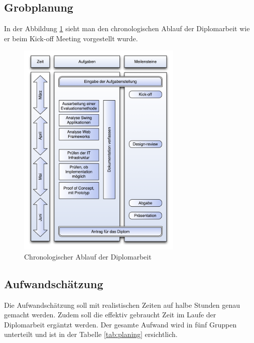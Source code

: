   \subsection{Grobplanung}
  
  In der Abbildung \ref{img:grobplanung} sieht man den chronologischen Ablauf
  der Diplomarbeit wie er beim Kick-off Meeting vorgestellt wurde.
  
  \begin{figure}[ht]
    \begin{center}
      \includegraphics[width=0.7\textwidth]{./image/grobplanung.png}
      \caption{Chronologischer Ablauf der Diplomarbeit}
      \label{img:grobplanung}
    \end{center}
  \end{figure}
  
  \subsection{Aufwandschätzung}
  
  Die Aufwandschätzung soll mit realistischen Zeiten auf halbe Stunden
  genau gemacht werden. Zudem soll die effektiv gebraucht Zeit im Laufe der
  Diplomarbeit ergäntzt werden. Der gesamte Aufwand wird in fünf Gruppen
  unterteilt und ist in der Tabelle \ref{tab:planing} ersichtlich.
  \newline
  
